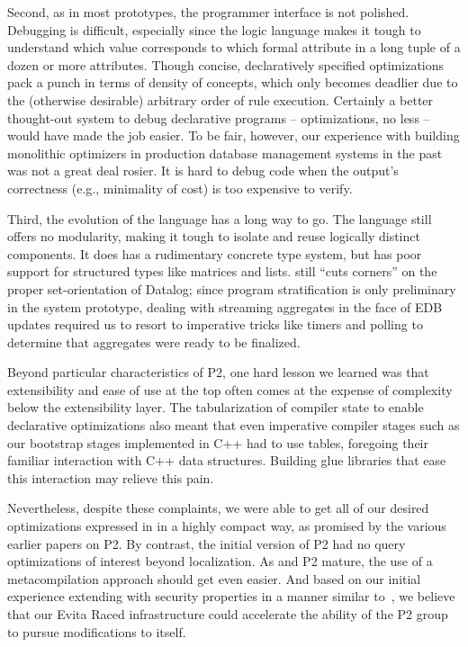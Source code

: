 Second, as in most prototypes, the programmer interface is not polished. Debugging is difficult, especially 
since the logic language makes it tough to understand which value corresponds to which formal
attribute in a long tuple of a dozen or more attributes.  Though concise, declaratively specified 
optimizations pack a punch in terms of density of concepts, which only becomes deadlier due to the (otherwise
desirable) arbitrary order of rule execution.  Certainly a better thought-out system to debug declarative 
programs -- optimizations, no less -- would have made the job easier.  To be fair, however, our
experience with building monolithic optimizers in production database management systems in the past 
was not a great deal rosier.  It is hard to debug code when the output's correctness (e.g., minimality of cost) 
is too expensive to verify.

Third, the evolution of the \OVERLOG language has a long way to go. The language still offers no modularity, 
making it tough to isolate and reuse logically distinct components. It does has a rudimentary concrete
type system, but has poor support for structured types like matrices and lists.  \OVERLOG still ``cuts corners'' 
on the proper set-orientation of Datalog; since program stratification is only preliminary in
the system prototype, dealing with streaming aggregates in the face of EDB updates required us to 
resort to imperative tricks like timers and polling to determine that aggregates were ready to be finalized.

Beyond particular characteristics of P2, one hard lesson we learned was that extensibility and ease of use at 
the top often comes at the expense of complexity below the extensibility layer.  The tabularization of
compiler state to enable declarative optimizations also meant that even imperative compiler stages such as our
bootstrap stages implemented in C++ had to use tables, foregoing their familiar interaction with C++ data 
structures.  Building glue libraries that ease this interaction may relieve this pain.

Nevertheless, despite these complaints, we were able to get all of our desired optimizations expressed 
in \OVERLOG in a highly compact way, as promised by the various earlier papers on P2.  By contrast, the 
initial version of P2 had no query optimizations of interest beyond localization.  As \OVERLOG and P2 mature, 
the use of a metacompilation approach should get even easier.  And based on our initial experience 
extending \OVERLOG with security properties in a manner similar to~\cite{abadi-netdb07}, we believe that 
our Evita Raced infrastructure could accelerate the ability of the P2 group to pursue modifications to 
\OVERLOG itself.

